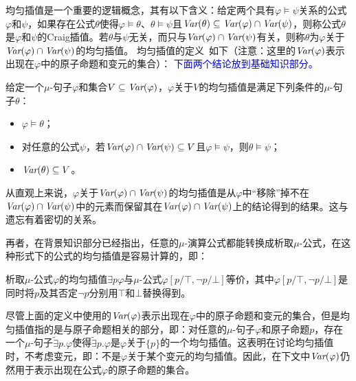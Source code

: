 均匀插值是一个重要的逻辑概念，其有以下含义：给定两个具有$\varphi\models\psi$关系的公式$\varphi$和$\psi$，如果存在公式$\theta$使得$\varphi\models \theta$、$\theta \models \psi$且$\textit{Var}(\theta) \subseteq \textit{Var}(\varphi) \cap \textit{Var}(\psi)$，则称公式$\theta$是$\varphi$和$\psi$的Craig插值。若$\theta$与$\psi$无关，而只与$\textit{Var}(\varphi) \cap \textit{Var}(\psi)$有关，则称$\theta$为$\varphi$关于$\textit{Var}(\varphi) \cap \textit{Var}(\psi)$的均匀插值。
均匀插值的定义~\cite{d2006modal}如下（注意：这里的$\textit{Var}(\varphi)$表示出现在$\varphi$中的原子命题和变元的集合）：                                                                                                                                                                                                                                   
\textcolor{blue}{下面两个结论放到基础知识部分。}           
\begin{definition}
	给定一个$\mu$-句子$\varphi$和集合$V\subseteq \textit{Var}(\varphi)$，$\varphi$关于$V$的均匀插值是满足下列条件的$\mu$-句子$\theta$：
	\begin{itemize}
		\item $\varphi \models \theta$；
		\item 对任意的公式$\psi$，若$\textit{Var}(\varphi) \cap \textit{Var}(\psi)\subseteq V$且$\varphi \models \psi$，则$\theta \models \psi$；
		\item $\textit{Var}(\theta) \subseteq V$。 
	\end{itemize}
\end{definition}


从直观上来说，$\varphi$关于$\textit{Var}(\varphi) \cap \textit{Var}(\psi)$的均匀插值是从$\varphi$中“移除”掉不在$\textit{Var}(\varphi) \cap \textit{Var}(\psi)$中的元素而保留其在$\textit{Var}(\varphi) \cap \textit{Var}(\psi)$上的结论得到的结果。这与遗忘有着密切的关系。

再者，在背景知识部分已经指出，任意的$\mu$-演算公式都能转换成析取$\mu$-公式，在这种形式下的公式的均匀插值是容易计算的，即：
\begin{theorem}
	析取$\mu$-公式$\varphi$的均匀插值$\exists p \varphi$与$\mu$-公式$\varphi[p/\top, \neg p/ \bot]$等价，其中$\varphi[p/\top, \neg p/ \bot]$是同时将$p$及其否定$\neg p$分别用$\top$和$\bot$替换得到。
\end{theorem}



尽管上面的定义中使用的$\textit{Var}(\varphi)$表示出现在$\varphi$中的原子命题和变元的集合，但是均匀插值指的是与原子命题相关的部分，即：对任意的$\mu$-句子$\varphi$和原子命题$p$，存在一个$\mu$-句子$\widetilde{\exists} p. \varphi$使得$\widetilde{\exists} p. \varphi$是$\varphi$关于$\{p\}$的一个均匀插值。这表明在讨论均匀插值时，不考虑变元，即：不是$\varphi$关于某个变元的均匀插值。因此，在下文中$\textit{Var}(\varphi)$仍然用于表示出现在公式$\varphi$的原子命题的集合。%

